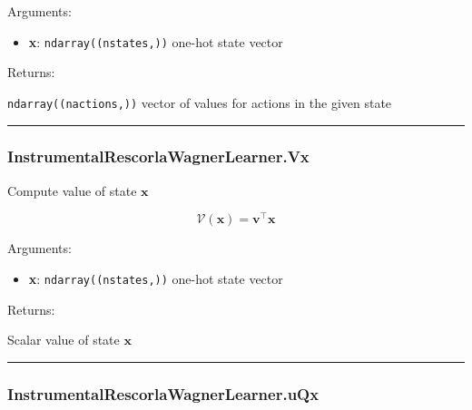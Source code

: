 Arguments:

\begin{itemize}
\tightlist
\item
  \textbf{x}: \texttt{ndarray((nstates,))} one-hot state vector
\end{itemize}

Returns:

\texttt{ndarray((nactions,))} vector of values for actions in the given
state

\begin{center}\rule{0.5\linewidth}{\linethickness}\end{center}

\hypertarget{instrumentalrescorlawagnerlearner.vx}{%
\subsubsection{InstrumentalRescorlaWagnerLearner.Vx}\label{instrumentalrescorlawagnerlearner.vx}}

\begin{Shaded}
\begin{Highlighting}[]
\end{Highlighting}
\end{Shaded}

Compute value of state \(\mathbf x\)

\[
\mathcal V(\mathbf x) = \mathbf v^\top \mathbf x
\]

Arguments:

\begin{itemize}
\tightlist
\item
  \textbf{x}: \texttt{ndarray((nstates,))} one-hot state vector
\end{itemize}

Returns:

Scalar value of state \(\mathbf x\)

\begin{center}\rule{0.5\linewidth}{\linethickness}\end{center}

\hypertarget{instrumentalrescorlawagnerlearner.uqx}{%
\subsubsection{InstrumentalRescorlaWagnerLearner.uQx}\label{instrumentalrescorlawagnerlearner.uqx}}

\begin{Shaded}
\begin{Highlighting}[]
\end{Highlighting}
\end{Shaded}

